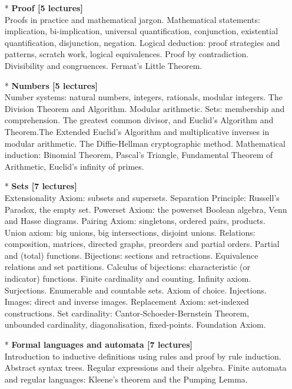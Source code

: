 \documentclass[a4paper]{article}
\begin{document}
\maketitle

\begin{itemize}
\item[*]\textbf{Proof [5 lectures]}\\
Proofs in practice and mathematical jargon. Mathematical statements: implication, bi-implication, universal quantification, conjunction, existential quantification, disjunction, negation. Logical deduction: proof strategies and patterns, scratch work, logical equivalences. Proof by contradiction. Divisibility and congruences. Fermat’s Little Theorem. 

\item[*]\textbf{Numbers [5 lectures]}\\
Number systems: natural numbers, integers, rationals, modular integers. The Division Theorem and Algorithm. Modular arithmetic. Sets: membership and comprehension. The greatest common divisor, and Euclid’s Algorithm and Theorem.The Extended Euclid’s Algorithm and multiplicative inverses in modular arithmetic. The Diffie-Hellman cryptographic method. Mathematical induction: Binomial Theorem, Pascal’s Triangle, Fundamental Theorem of Arithmetic, Euclid’s inﬁnity of primes. 

\item[*]\textbf{Sets [7 lectures]}\\
Extensionality Axiom: subsets and supersets. Separation Principle: Russell’s Paradox, the empty set. Powerset Axiom: the powerset Boolean algebra, Venn and Hasse diagrams. Pairing Axiom: singletons, ordered pairs, products. Union axiom: big unions, big intersections, disjoint unions. Relations: composition, matrices, directed graphs, preorders and partial orders. Partial and (total) functions. Bijections: sections and retractions. Equivalence relations and set partitions. Calculus of bijections: characteristic (or indicator) functions. Finite cardinality and counting. Infinity axiom. Surjections. Enumerable and countable sets. Axiom of choice. Injections. Images: direct and inverse images. Replacement Axiom: set-indexed constructions. Set cardinality: Cantor-Schoeder-Bernstein Theorem, unbounded cardinality, diagonalisation, fixed-points. Foundation Axiom. 

\item[*]\textbf{Formal languages and automata [7 lectures]}\\
Introduction to inductive definitions using rules and proof by rule induction. Abstract syntax trees. Regular expressions and their algebra. Finite automata and regular languages: Kleene’s theorem and the Pumping Lemma.


\end{itemize}
\end{document}
